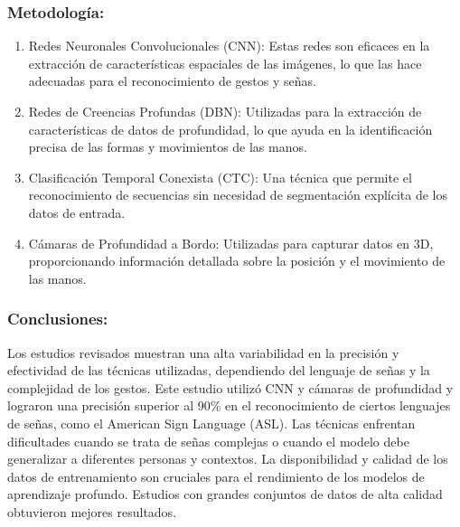 \subsubsection {Metodología: }
	\begin{enumerate}
		\item {Redes Neuronales Convolucionales (CNN): }
		Estas redes son eficaces en la extracción de características espaciales de las imágenes, lo que las hace adecuadas para el reconocimiento de gestos y señas.
		\item {Redes de Creencias Profundas (DBN): }
		Utilizadas para la extracción de características de datos de profundidad, lo que ayuda en la identificación precisa de las formas y movimientos de las manos.
		\item {Clasificación Temporal Conexista (CTC): }
		Una técnica que permite el reconocimiento de secuencias sin necesidad de segmentación explícita de los datos de entrada.
		\item {Cámaras de Profundidad a Bordo: }
		Utilizadas para capturar datos en 3D, proporcionando información detallada sobre la posición y el movimiento de las manos.
	\end{enumerate}
\subsubsection {Conclusiones: }
Los estudios revisados muestran una alta variabilidad en la precisión y efectividad de las técnicas utilizadas, dependiendo del lenguaje de señas y la complejidad de los gestos. Este estudio utilizó CNN y cámaras de profundidad y lograron una precisión superior al 90\% en el reconocimiento de ciertos lenguajes de señas, como el American Sign Language (ASL). Las técnicas enfrentan dificultades cuando se trata de señas complejas o cuando el modelo debe generalizar a diferentes personas y contextos. La disponibilidad y calidad de los datos de entrenamiento son cruciales para el rendimiento de los modelos de aprendizaje profundo. Estudios con grandes conjuntos de datos de alta calidad obtuvieron mejores resultados.

